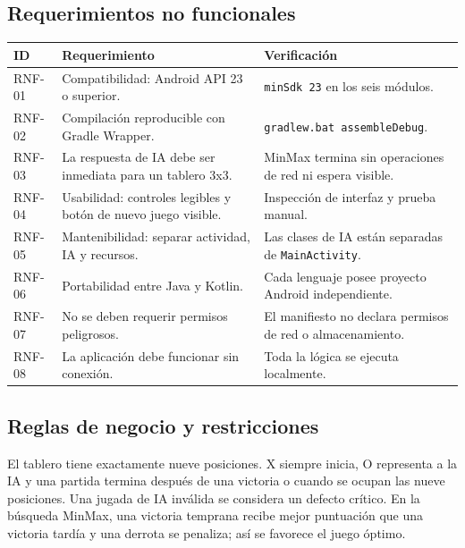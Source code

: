\documentclass[stu,a4paper,12pt,floatsintext]{apa7}
\begin{document}
\subsection{Requerimientos no funcionales}
\begin{longtable}{p{}p{}p{}}
\toprule
\textbf{ID} & \textbf{Requerimiento} & \textbf{Verificación}\\
\midrule
RNF-01 & Compatibilidad: Android API 23 o superior.
 & \texttt{minSdk 23} en los seis módulos.\\
RNF-02 & Compilación reproducible con Gradle Wrapper.
 & \texttt{gradlew.bat assembleDebug}.\\
RNF-03 & La respuesta de IA debe ser inmediata para un tablero 3x3.
 & MinMax termina sin operaciones de red ni espera visible.\\
RNF-04 & Usabilidad: controles legibles y botón de nuevo juego visible.
 & Inspección de interfaz y prueba manual.\\
RNF-05 & Mantenibilidad: separar actividad, IA y recursos.
 & Las clases de IA están separadas de \texttt{MainActivity}.\\
RNF-06 & Portabilidad entre Java y Kotlin.
 & Cada lenguaje posee proyecto Android independiente.\\
RNF-07 & No se deben requerir permisos peligrosos.
 & El manifiesto no declara permisos de red o almacenamiento.\\
RNF-08 & La aplicación debe funcionar sin conexión.
 & Toda la lógica se ejecuta localmente.\\
\bottomrule
\end{longtable}

\subsection{Reglas de negocio y restricciones}
El tablero tiene exactamente nueve posiciones. X siempre inicia, O representa
a la IA y una partida termina después de una victoria o cuando se ocupan las
nueve posiciones. Una jugada de IA inválida se considera un defecto crítico.
En la búsqueda MinMax, una victoria temprana recibe mejor puntuación que una
victoria tardía y una derrota se penaliza; así se favorece el juego óptimo.
\end{document}
